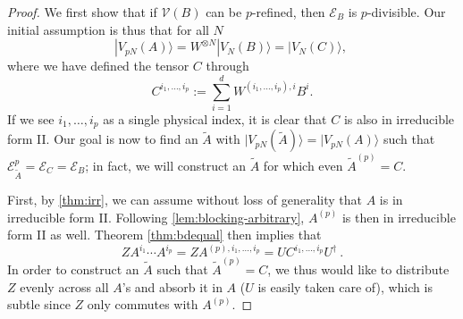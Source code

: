 \documentclass[pra,a4paper,notitlepage,nofootinbib,superscriptaddress]{revtex4-1}
\theoremstyle{plain}
\newcommand{\1}{{\openone}}
\newcommand{\ra}{\rangle}
\newcommand{\mc}{\mathcal}
\begin{document}
\begin{proof}
    We first show that if $\mc V(B)$ can be $p$-refined, then $\mathcal
        E_B$ is $p$-divisible. Our initial assumption is thus that for all $N$
    \[
        |V_{pN}(A)\ra = W^{\otimes N}|V_N(B)\ra =\vert V_N(C)\rangle,\
    \]
    where we have defined the tensor $C$ through
    $$
        C^{i_1,\ldots,i_p} := \sum_{i=1}^d W^{{(i_1,\ldots,i_p)},i}B^i.
    $$
    If we see $i_1,\ldots,i_p$ as a single physical index, it is clear that
    $C$ is also in irreducible form II.
    Our goal is now to find an $\tilde A$ with $\vert V_{pN}(\tilde A)\ra =
        \vert V_{pN}(A)\rangle$ such that $\mathcal E_{\tilde A}^p = \mathcal
        E_C=\mathcal E_B$; in fact, we will construct an $\tilde A$ for which
    even $\tilde A^{(p)}=C$.

    First, by \cref{thm:irr}, we can assume without loss of generality that $A$ is in
    irreducible form II. Following \cref{lem:blocking-arbitrary}, $A^{(p)}$ is
    then in irreducible form II as well.  Theorem \ref{thm:bdequal} then
    implies that
    \[
        ZA^{i_1}\cdots A^{i_p}=
        ZA^{(p),i_1,\dots,i_p}=
        UC^{i_1,\ldots,i_p}U^{\dagger}\ .
    \]
    In order to construct an $\tilde A$ such that  $\tilde A^{(p)}=C$, we thus
    would like to distribute $Z$ evenly across all $A$'s and absorb it in $A$
    ($U$ is easily taken care of), which is subtle since $Z$ only commutes
    with $A^{(p)}$.


\end{proof}
\end{document}
